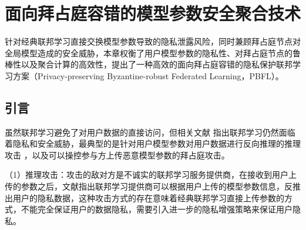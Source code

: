 \chapter{面向拜占庭容错的模型参数安全聚合技术}\label{pbfl}
针对经典联邦学习直接交换模型参数导致的隐私泄露风险，同时兼顾拜占庭节点对全局模型造成的安全威胁，本章权衡了用户模型参数的隐私性、对拜占庭节点的鲁棒性以及聚合计算的高效性，提出了一种高效的面向拜占庭容错的隐私保护联邦学习方案（Privacy-preserving Byzantine-robust Federated Learning，PBFL）。

\section{引言}

虽然联邦学习避免了对用户数据的直接访问，但相关文献\cite{kairouz2019advances, mothukuri2021survey, geiping2020inverting} 指出联邦学习仍然面临着隐私和安全威胁，最典型的是针对用户模型参数对用户数据进行反向推理的推理攻击 \cite{geiping2020inverting}，以及可以操控参与方上传恶意模型参数的拜占庭攻击\cite{kairouz2019advances, mothukuri2021survey}。

（1）推理攻击：攻击的敌对方是不诚实的联邦学习服务提供商，在接收到用户上传的参数之后，文献\cite{geiping2020inverting}指出联邦学习提供商可以根据用户上传的模型参数信息，反推出用户的隐私数据，这种攻击方式的存在意味着经典联邦学习直接上传参数的方式，不能完全保证用户的数据隐私，需要引入进一步的隐私增强策略来保证用户隐私。%

